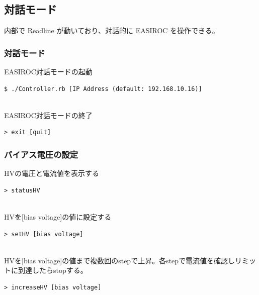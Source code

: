 \newpage
\subsection{対話モード}
内部で Readline が動いており、対話的に EASIROC を操作できる。
\subsubsection{対話モード}
EASIROC対話モードの起動
\begin{shadebox}
\begin{verbatim}
$ ./Controller.rb [IP Address (default: 192.168.10.16)]
\end{verbatim}
\end{shadebox}
　\\
EASIROC対話モードの終了
\begin{shadebox}
\begin{verbatim}
> exit [quit]
\end{verbatim}
\end{shadebox}


\subsubsection{バイアス電圧の設定}

HVの電圧と電流値を表示する
\begin{shadebox}
\begin{verbatim}
> statusHV
\end{verbatim}
\end{shadebox}
　\\
HVを[bias voltage]の値に設定する
\begin{shadebox}
\begin{verbatim}
> setHV [bias voltage]
\end{verbatim}
\end{shadebox}
　\\
HVを[bias voltage]の値まで複数回のstepで上昇。各stepで電流値を確認しリミットに到達したらstopする。
\begin{shadebox}
\begin{verbatim}
> increaseHV [bias voltage]
\end{verbatim}
\end{shadebox}

